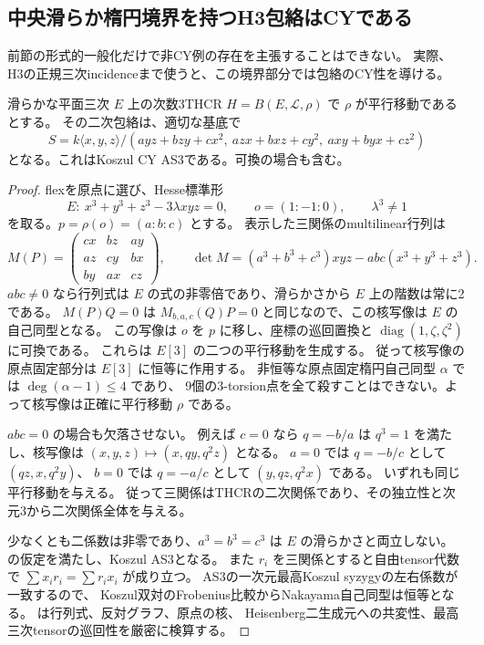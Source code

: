 \subsection{中央滑らか楕円境界を持つH3包絡はCYである}
\label{subsec:central-elliptic-CY-envelope}
前節の形式的一般化だけで非CY例の存在を主張することはできない。
実際、H3の正規三次incidenceまで使うと、この境界部分では包絡のCY性を導ける。

\begin{lemma}[平行移動境界の二次包絡]
\label{lem:translation-elliptic-quadratic-envelope}
滑らかな平面三次 $E$ 上の次数3THCR $H=B(E,\mathcal L,\rho)$ で
$\rho$ が平行移動であるとする。
その二次包絡は、適切な基底で
\[
 S=k\langle x,y,z\rangle/(a yz+b zy+c x^2,\ a zx+b xz+c y^2,\ a xy+b yx+c z^2)
\]
となる。これはKoszul CY AS3である。可換の場合も含む。
\end{lemma}
\begin{proof}
flexを原点に選び、Hesse標準形\cite[Lemma 1]{ADHesse}
\[
 E:\ x^3+y^3+z^3-3\lambda xyz=0,\qquad o=(1:-1:0),\qquad\lambda^3\ne1
\]
を取る。$p=\rho(o)=(a:b:c)$ とする。
表示した三関係のmultilinear行列は
\[
 M(P)=\begin{pmatrix}cx&bz&ay\\az&cy&bx\\by&ax&cz\end{pmatrix},\qquad
 \det M=(a^3+b^3+c^3)xyz-abc(x^3+y^3+z^3).
\]
$abc\ne0$ なら行列式は $E$ の式の非零倍であり、滑らかさから $E$ 上の階数は常に2である。
$M(P)Q=0$ は $M_{b,a,c}(Q)P=0$ と同じなので、この核写像は $E$ の自己同型となる。
この写像は $o$ を $p$ に移し、座標の巡回置換と
$\operatorname{diag}(1,\zeta,\zeta^2)$ に可換である。
これらは $E[3]$ の二つの平行移動を生成する\cite[\S4, (15)]{ADHesse}。
従って核写像の原点固定部分は $E[3]$ に恒等に作用する。
非恒等な原点固定楕円自己同型 $\alpha$ では $\deg(\alpha-1)\le4$ であり、
9個の3-torsion点を全て殺すことはできない。よって核写像は正確に平行移動 $\rho$ である。

$abc=0$ の場合も欠落させない。
例えば $c=0$ なら $q=-b/a$ は $q^3=1$ を満たし、核写像は
$(x,y,z)\mapsto(x,qy,q^2z)$ となる。
$a=0$ では $q=-b/c$ として $(qz,x,q^2y)$、
$b=0$ では $q=-a/c$ として $(y,qz,q^2x)$ である。
いずれも同じ平行移動を与える。
従って三関係はTHCRの二次関係であり、その独立性と次元3から二次関係全体を与える。

少なくとも二係数は非零であり、$a^3=b^3=c^3$ は $E$ の滑らかさと両立しない。
\cite[Theorem 1.1, Corollary 6.1]{ISSklyanin}の仮定を満たし、Koszul AS3となる。
また $r_i$ を三関係とすると自由tensor代数で
$\sum x_i r_i=\sum r_i x_i$ が成り立つ。
AS3の一次元最高Koszul syzygyの左右係数が一致するので、
Koszul双対のFrobenius比較からNakayama自己同型は恒等となる。
 は行列式、反対グラフ、原点の核、
Heisenberg二生成元への共変性、最高三次tensorの巡回性を厳密に検算する。
\end{proof}

